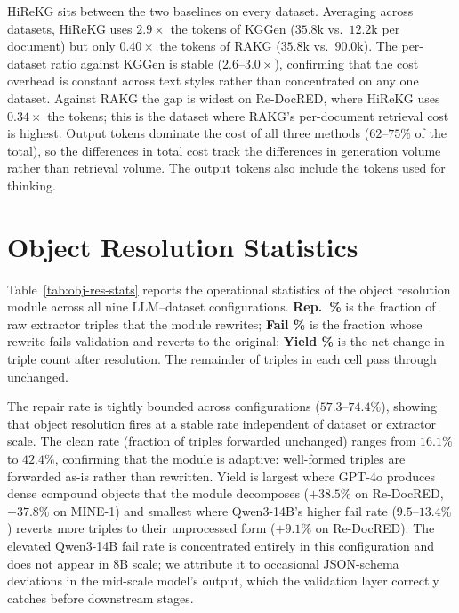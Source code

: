 \documentclass[11pt]{article}
\begin{document}
HiReKG sits between the two baselines on every dataset. Averaging across datasets, HiReKG uses $2.9\times$ the tokens of KGGen ($35.8$k vs.\ $12.2$k per document) but only $0.40\times$ the tokens of RAKG ($35.8$k vs.\ $90.0$k). The per-dataset ratio against KGGen is stable ($2.6$--$3.0\times$), confirming that the cost overhead is constant across text styles rather than concentrated on any one dataset. Against RAKG the gap is widest on Re-DocRED, where HiReKG uses $0.34\times$ the tokens; this is the dataset where RAKG's per-document retrieval cost is highest. Output tokens dominate the cost of all three methods ($62$--$75\%$ of the total), so the differences in total cost track the differences in generation volume rather than retrieval volume. The output tokens also include the tokens used for thinking.

\section{Object Resolution Statistics}
\label{app:obj-res}

Table~\ref{tab:obj-res-stats} reports the operational statistics of the object resolution module across all nine LLM--dataset configurations. \textbf{Rep.\ \%} is the fraction of raw extractor triples that the module rewrites; \textbf{Fail \%} is the fraction whose rewrite fails validation and reverts to the original; \textbf{Yield \%} is the net change in triple count after resolution. The remainder of triples in each cell pass through unchanged.



The repair rate is tightly bounded across configurations ($57.3$--$74.4\%$), showing that object resolution fires at a stable rate independent of dataset or extractor scale. The clean rate (fraction of triples forwarded unchanged) ranges from $16.1\%$ to $42.4\%$, confirming that the module is adaptive: well-formed triples are forwarded as-is rather than rewritten. Yield is largest where GPT-4o produces dense compound objects that the module decomposes ($+38.5\%$ on Re-DocRED, $+37.8\%$ on MINE-1) and smallest where Qwen3-14B's higher fail rate ($9.5$--$13.4\%$) reverts more triples to their unprocessed form ($+9.1\%$ on Re-DocRED). The elevated Qwen3-14B fail rate is concentrated entirely in this configuration and does not appear in 8B scale; we attribute it to occasional JSON-schema deviations in the mid-scale model's output, which the validation layer correctly catches before downstream stages.
\end{document}
